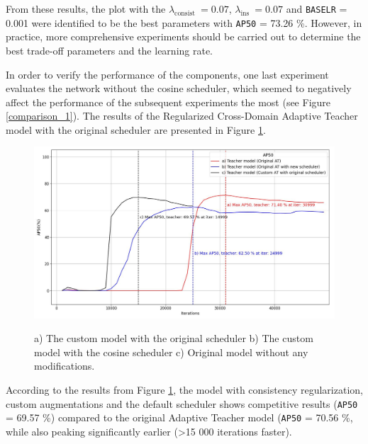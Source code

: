 From these results, the plot with the $\lambda_{\text {consist }} = 0.07$, $\lambda_{\text {ins }} = 0.07$ and \texttt{BASE\textunderscore LR} = 0.001 were identified to be the best parameters with \texttt{AP50} = 73.26 \%. However, in practice, more comprehensive experiments should be carried out to determine the best trade-off parameters and the learning rate. 

In order to verify the performance of the components, one last experiment evaluates the network without the cosine scheduler, which seemed to negatively affect the performance of the subsequent experiments the most (see Figure \ref{comparison_1}). The results of the Regularized Cross-Domain Adaptive Teacher model with the original scheduler are presented in Figure \ref{myModel_withOrigSched}.

\begin{figure}[htb]
	\begin{center}
		\includegraphics[width=14cm]{./AP50_myModel_origScheduler.jpg}
	\end{center}
	\caption{a) The custom model with the original scheduler b) The custom model with the cosine scheduler c) Original model without any modifications.}
	\begin{center}
		\label{myModel_withOrigSched}
	\end{center}
\end{figure}
\FloatBarrier

According to the results from Figure \ref{myModel_withOrigSched}, the model with consistency regularization, custom augmentations and the default scheduler shows competitive results (\texttt{AP50} = 69.57 \%) compared to the original Adaptive Teacher model (\texttt{AP50} = 70.56 \%, while also peaking significantly earlier (>15 000 iterations faster).  

